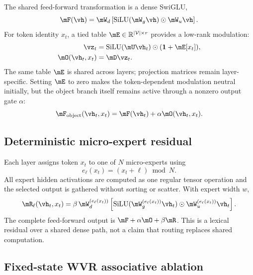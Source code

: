 The shared feed-forward transformation is a dense SwiGLU,
\begin{equation}
    \mF(\vh)=\mW_d\left[\operatorname{SiLU}(\mW_g\vh)\odot \mW_u\vh\right].
\end{equation}
For token identity $x_t$, a tied table $\mE\in\mathbb{R}^{|\mathcal V|\times r}$ provides a low-rank modulation:
\begin{align}
    \vz_t &= \operatorname{SiLU}(\mU\vh_t)\odot(\mathbf{1}+\mE[x_t]),\\
    \mO(\vh_t,x_t) &= \mD\vz_t.
\end{align}
The same table $\mE$ is shared across layers; projection matrices remain layer-specific. Setting $\mE$ to zero makes the token-dependent modulation neutral initially, but the object branch itself remains active through a nonzero output gate $\alpha$:
\begin{equation}
    \mF_{\mathrm{object}}(\vh_t,x_t)=\mF(\vh_t)+\alpha\mO(\vh_t,x_t).
\end{equation}

\subsection{Deterministic micro-expert residual}

Each layer assigns token $x_t$ to one of $N$ micro-experts using
\begin{equation}
    e_\ell(x_t)=(x_t+\ell)\bmod N.
\end{equation}
All expert hidden activations are computed as one regular tensor operation and the selected output is gathered without sorting or scatter. With expert width $w$,
\begin{equation}
    \mR_\ell(\vh_t,x_t)=\beta\,\mW^{(e_\ell(x_t))}_{d}
    \left[\operatorname{SiLU}(\mW^{(e_\ell(x_t))}_{g}\vh_t)
    \odot \mW^{(e_\ell(x_t))}_{u}\vh_t\right].
\end{equation}
The complete feed-forward output is $\mF+\alpha\mO+\beta\mR$. This is a lexical residual over a shared dense path, not a claim that routing replaces shared computation.

\subsection{Fixed-state WVR associative ablation}

